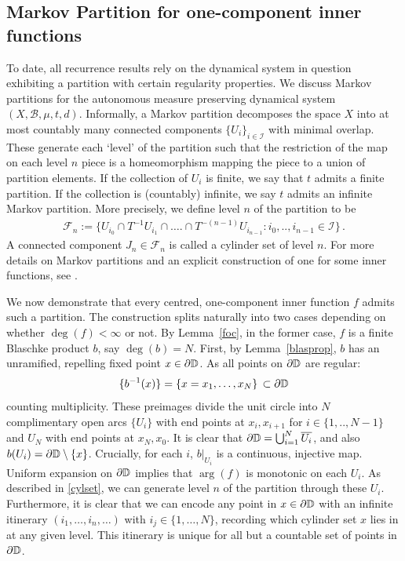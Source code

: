 \documentclass[11pt,reqno]{amsart}
\newcommand{\D}{{\Bbb D}}
\newcommand{\0}{\mathbf{0}}
\theoremstyle{remark}
\numberwithin{equation}{section}
\theoremstyle{remark}
\numberwithin{equation}{section}
\begin{document}
\subsection{Markov Partition for one-component inner functions}\label{Markov}
To date, all recurrence results rely on the dynamical system in question exhibiting a partition with certain regularity properties. 
We discuss Markov partitions for the autonomous measure preserving dynamical system $(X,\mathcal{B},\mu,t,d)$. Informally, a Markov partition decomposes the space $X$ into at most countably many connected components $\{U_i\}_{i \in \mathcal{I}}$ with minimal overlap. These generate each `level' of the partition such that the restriction of the map on each level $n$ piece is a homeomorphism mapping the piece to a union of partition elements. If the collection of $U_i$ is finite, we say that $t$ admits a finite partition. If the collection is (countably) infinite, we say $t$ admits an infinite Markov partition.    
 More precisely, we define level $n$ of the partition to be 
 \begin{eqnarray}\label{cylset}
     \mathcal{F}_n:=\{ U_{i_0} \cap T^{-1}U_{i_1} \cap \dots. \cap T^{-(n-1)}U_{i_{n-1}}: i_0,..,i_{n-1} \in \mathcal{I}\} \, .
 \end{eqnarray}
 A connected component $J_n \in \mathcal{F}_n$ is called a cylinder set of level $n$. For more details on Markov partitions and an explicit construction of one for some inner functions, see \cite{fernandez2007}.
 
 We now demonstrate that every centred, one-component inner function $f$ admits such a partition. The construction splits naturally into two cases depending on whether $\deg(f)<\infty$ or not. 
By Lemma~\ref{foc}, in the former case, $f$ is  a finite Blaschke product $b$, say $\deg(b)=N$.  First, by Lemma~\ref{blasprop}, $b$ has an unramified, repelling fixed point $x \in \partial \D$. As all points on $\partial \D$ are regular:
$$\{b^{-1}(x)\}= \{x=x_1,\dots,x_N \} \, \subset \partial \D$$
counting multiplicity.
 These preimages divide the unit circle into $N$ complimentary open arcs $\{U_i\}$ with end points at $x_i,x_{i+1}$ for $i \in \{1,..,N-1\}$ and $U_N$ with end points at $x_{N},x_0$. It is clear that $\partial \D  = \bigcup_{i=1}^N \overline{U_i}$, and also $b(U_i)= \partial \D \setminus \{x\}$. Crucially, for each $i$, $b|_{U_i}$ is a continuous, injective map. Uniform expansion on $\partial \D$ implies that $\arg(f)$ is monotonic on each $U_i$.
As described in \eqref{cylset}, we can generate level $n$ of the partition through these $U_i$. Furthermore, it is clear that we can encode any point in $ x \in \partial \D$ with an infinite itinerary $(i_1,\dots,i_n,\dots)$ with $i_j \in \{1,\dots,N\}$, recording which cylinder set $x$ lies in at any given level. This itinerary is unique for all but a countable set of points in $\partial \D$. 
\\
\end{document}
